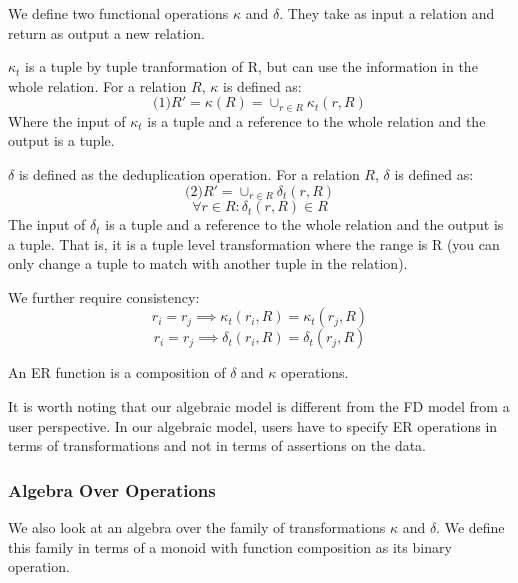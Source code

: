 \begin{definition}
We define two functional operations $\kappa$ and $\delta$.
They take as input a relation and return as output a new relation.

$\kappa_t$ is a tuple by tuple tranformation of R, but can use the information in the whole relation.
For a relation $R$, $\kappa$ is defined as:
\[
\text{(1)}  R' = \kappa(R) = \cup_{r \in R} \kappa_t(r,R)
\]
Where the input of $\kappa_t$ is a tuple and a reference to the whole relation
and the output is a tuple.

$\delta$ is defined as the deduplication operation.
For a relation $R$, $\delta$ is defined as:
\[
\text{(2)}  R' = \cup_{r \in R} \delta_t(r,R)
\]
\[
\forall r \in R: \delta_t(r,R) \in R
\]
The input of $\delta_t$ is a tuple and a reference to the whole relation
and the output is a tuple.
That is, it is a tuple level transformation where the range is R (you can only change a tuple to match with another tuple in the relation).

We further require consistency:
\[
r_i = r_j \implies \kappa_t(r_i,R) = \kappa_t(r_j,R)
\]
\[
r_i = r_j \implies \delta_t(r_i,R) = \delta_t(r_j,R)
\]

An ER function is a composition of $\delta$ and $\kappa$ operations.
\end{definition}

It is worth noting that our algebraic model is different from the FD model from a user perspective.
In our algebraic model, users have to specify ER operations in terms of transformations and not in terms of assertions on the data.

\subsubsection{Algebra Over Operations}
We also look at an algebra over the family of transformations $\kappa$ and $\delta$.
We define this family in terms of a monoid with function composition as its binary operation.










